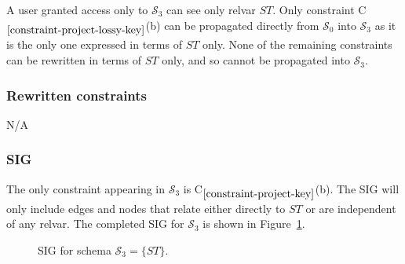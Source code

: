 \documentclass{article}
\newcommand{\RelProject}{\ensuremath{\pi}}
\newcounter{constraint}
\newcommand{\identifier}[1]{\ensuremath{\mathit{#1}}}
\newcommand{\ST}{\identifier{ST}}
\newcommand{\Sno}{\identifier{Sno}}
\newcommand{\Status}{\identifier{Status}}
\newcommand{\Type}[1]{\ensuremath{T_{#1}}}
\newcommand{\TT}[1]{\ensuremath{T_{\{#1\}}}}
\newcommand{\schema}[1]{\ensuremath{\mathcal{S}_{#1}}}
\newcommand{\Constraint}[2][]{C\ensuremath{_{#2}\ifx&#1&\else^{#1}\fi}}
\begin{document}
\noindent A user granted access only to \(\schema{3}\) can see only relvar \(\ST\). Only constraint \Constraint{\ref{constraint-project-lossy-key}}(b) can be propagated directly from \(\schema{0}\) into \(\schema{3}\) as it is the only one expressed in terms of \(\ST\) only. None of the remaining constraints can be rewritten in terms of \(\ST\) only, and so cannot be propagated into \(\schema{3}\).




\subsubsection{Rewritten constraints}
\label{sec-constraints-s-iii-project-lossy}

N/A




\subsubsection{SIG}
\label{sec-sigs-s-iii-project-lossy}

\noindent The only constraint appearing in \(\schema{3}\) is \Constraint{\ref{constraint-project-key}}(b). The SIG will only include edges and nodes that relate either directly to \(\ST\) or are independent of any relvar. The completed SIG for \(\schema{3}\) is shown in Figure~\ref{fig-sig-s-iii-project-lossy}.


\begin{figure}
    \centering
    \caption{SIG for schema \(\schema{3} = \{\ST\}\).}
    \label{fig-sig-s-iii-project-lossy}
\end{figure}
\end{document}
